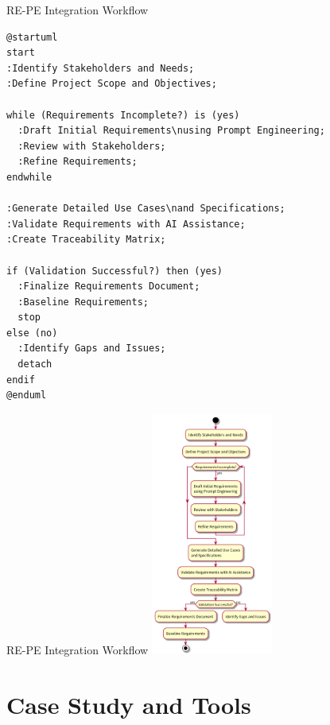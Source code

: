 \documentclass{beamer}
\begin{document}
\begin{frame}[fragile]{RE-PE Integration Workflow}
    \lstset{style=plantuml}
    \begin{lstlisting}[caption={Requirements Engineering Workflow}]
@startuml
start
:Identify Stakeholders and Needs;
:Define Project Scope and Objectives;

while (Requirements Incomplete?) is (yes)
  :Draft Initial Requirements\nusing Prompt Engineering;
  :Review with Stakeholders;
  :Refine Requirements;
endwhile

:Generate Detailed Use Cases\nand Specifications;
:Validate Requirements with AI Assistance;
:Create Traceability Matrix;

if (Validation Successful?) then (yes)
  :Finalize Requirements Document;
  :Baseline Requirements;
  stop
else (no)
  :Identify Gaps and Issues;
  detach
endif
@enduml
    \end{lstlisting}
\end{frame}

\begin{frame}[fragile]{RE-PE Integration Workflow}
    \centering
    \includegraphics[width=0.3\textwidth]{images/re-pe.png} %
\end{frame}
\section{Case Study and Tools}
\end{document}
